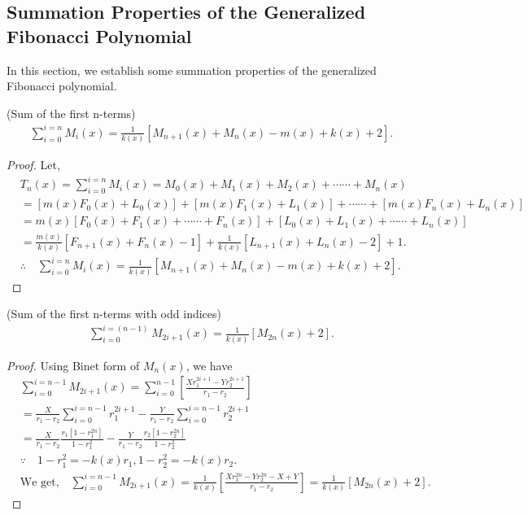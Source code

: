 \subsection{Summation Properties of the Generalized Fibonacci Polynomial}
In this section, we establish some summation properties of  the generalized Fibonacci polynomial.
\begin{theorem}(Sum of the first n-terms)
\begin{align*}
\sum_{i=0}^{i=n}M_{i}(x)=\frac{1}{k(x)}[M_{n+1}(x)+M_{n}(x)-m(x)+k(x)+2].
\end{align*}
\end{theorem}
\begin{proof}
Let,
\begin{align*}
&T_{n}(x)=\sum_{i=0}^{i=n}M_{i}(x)=M_{0}(x)+M_{1}(x)+M_{2}(x)+\cdots\cdots+M_{n}(x)\\
&=[m(x)F_{0}(x)+L_{0}(x)]+[m(x)F_{1}(x)+L_{1}(x)]+\cdots\cdots+[m(x)F_{n}(x)+L_{n}(x)]\\
&=m(x)[F_{0}(x)+F_{1}(x)+\cdots\cdots+F_{n}(x)]+[L_{0}(x)+L_{1}(x)+\cdots\cdots+L_{n}(x)]\\
&=\frac{m(x)}{k(x)}[F_{n+1}(x)+F_{n}(x)-1]+\frac{1}{k(x)}[L_{n+1}(x)+L_{n}(x)-2]+1.\\
&\therefore \quad \sum_{i=0}^{i=n}M_{i}(x)=\frac{1}{k(x)}[M_{n+1}(x)+M_{n}(x)-m(x)+k(x)+2].
\end{align*}
\end{proof}
\begin{theorem}(Sum of the first n-terms with odd indices)
\begin{align*}
\sum_{i=0}^{i=(n-1)}M_{2i+1}(x)=\frac{1}{k(x)}[M_{2n}(x)+2].
\end{align*}
\end{theorem}
\begin{proof}
Using Binet form of $M_{n}(x)$, we have
\begin{align*}
&\sum_{i=0}^{i=n-1}M_{2i+1}(x)=\sum_{i=0}^{n-1}[\frac{Xr_{1}^{2i+1}-Yr_{2}^{2i+1}}{r_{1}-r_{2}}]\\
&=\frac{X}{r_{1}-r_{2}}\sum_{i=0}^{i=n-1}r_{1}^{2i+1}-\frac{Y}{r_{1}-r_{2}}\sum_{i=0}^{i=n-1}r_{2}^{2i+1}\\
&=\frac{X}{r_{1}-r_{2}}\frac{r_{1}[1-r_{1}^{2n}]}{1-r_{1}^2}-\frac{Y}{r_{1}-r_{2}}\frac{r_{2}[1-r_{2}^{2n}]}{1-r_{2}^2}\\
&\because\quad
1-r_{1}^2=-k(x)r_{1},
1-r_{2}^2=-k(x)r_{2}.\\
&\text{We get,}\quad
\sum_{i=0}^{i=n-1}M_{2i+1}(x)=\frac{1}{k(x)}[\frac{Xr_{1}^{2n}-Yr_{2}^{2n}-X+Y}{r_{1}-r_{2}}]=\frac{1}{k(x)}[M_{2n}(x)+2].
\end{align*}
\end{proof}
